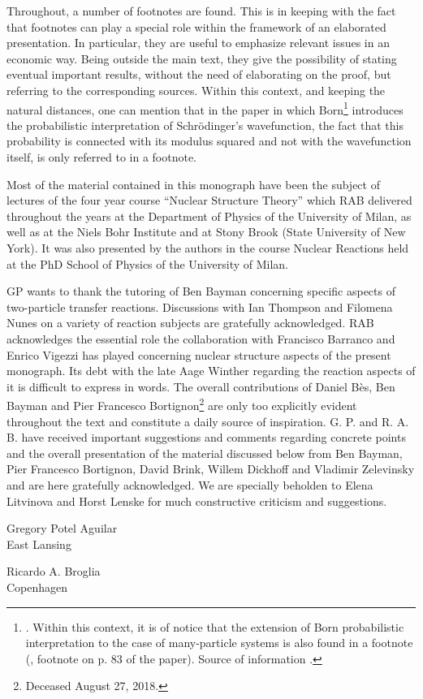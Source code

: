 \newpage
Throughout, a number of footnotes are found. This is in keeping with the fact that footnotes can play a special role within the framework of an elaborated presentation. In particular, they are useful to emphasize relevant issues in an economic way. Being outside the main text, they give the possibility of stating eventual important results, without the need of elaborating on the proof, but referring to the corresponding sources.
 Within this context, and keeping the natural distances, one can mention that in the paper  in which Born\footnote{\cite{Born:26}. Within this context, it is of notice that the extension of Born probabilistic interpretation to the case of many-particle systems is also found in a footnote (\cite{Pauli:27}, footnote on p. 83 of the paper). Source of information \cite{Pais:86}.} introduces the probabilistic interpretation of Schr\"odinger's  wavefunction, the fact that this probability is connected with its modulus squared and not with the wavefunction itself, is only referred to in a footnote.



  Most of the material contained in this monograph have been the subject of lectures of the four year course ``Nuclear Structure Theory'' which RAB delivered throughout the years at the Department of Physics of the University of Milan, as well as at the Niels Bohr Institute and at Stony Brook (State University of New York). It was also presented by the authors in the course Nuclear Reactions held at the PhD School of Physics of the University of Milan.

GP wants to thank the tutoring of  Ben Bayman concerning specific aspects of two-particle transfer reactions. Discussions with Ian Thompson and Filomena Nunes on a variety of reaction subjects are gratefully acknowledged. 
RAB  acknowledges the essential role the collaboration with Francisco Barranco and Enrico Vigezzi has played concerning  nuclear structure aspects of the present monograph. Its debt with the late Aage Winther regarding the reaction aspects of it is difficult to express in words. The overall contributions of Daniel B\`{e}s, Ben Bayman and Pier Francesco Bortignon\footnote{Deceased August 27, 2018.} are only too explicitly evident throughout the text and constitute a daily source of inspiration.  G. P. and R. A. B. have received important suggestions and comments regarding concrete points and the overall presentation of the material discussed below from Ben Bayman, Pier Francesco Bortignon, David Brink, Willem Dickhoff and Vladimir Zelevinsky and are here gratefully acknowledged. We are specially beholden to Elena Litvinova and Horst Lenske for much constructive criticism and suggestions.
\begin{flushleft}
Gregory Potel Aguilar\\
 East Lansing
\end{flushleft}
\vspace{-1.7cm}
\begin{flushright}
Ricardo A. Broglia\\
 Copenhagen
\end{flushright}

%
%
